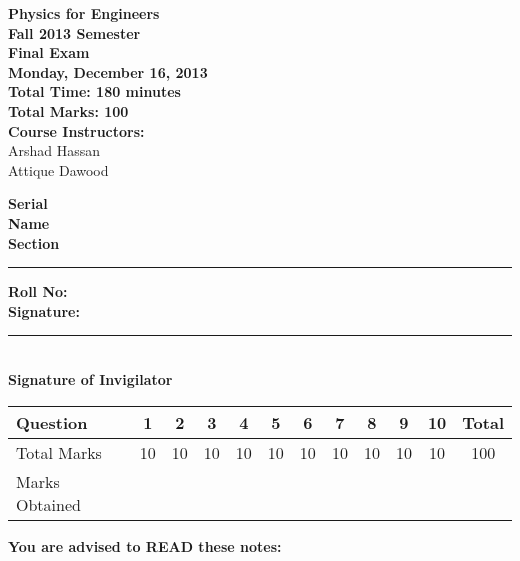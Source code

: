 \documentclass[12pt,a4paper]{article}
\def\QOne{10}
\def\Qtwo{10}
\def\Qthree{10}
\def\Qfour{10}
\def\Qfive{10}
\def\Qsix{10}
\def\Qseven{10}
\def\Qeight{10}
\def\Qnine{10}
\def\Qten{10}
\def\TotalMarks{100}
\begin{document}
\begin{minipage}{0.55\textwidth}
{\LARGE \textbf{Physics for Engineers}}\\[0.15cm]
{\normalsize \textbf{Fall 2013 Semester}}\\
{\Large \textbf{Final Exam}}\\
{\normalsize \textbf{Monday, December 16, 2013}}\\[0.30cm]
{\Large \textbf{Total Time: 180 minutes}}\\[0.15cm]
{\Large \textbf{Total Marks: 100}}\\
\textbf{Course Instructors:}\\
Arshad Hassan\\
Attique Dawood\\
\end{minipage}
\begin{minipage}{0.4\textwidth}
\textbf{Serial} \hrulefill \\[0.25cm]
\textbf{Name} \hrulefill\\[0.25cm]
\textbf{Section} \rule{1cm}{0.2mm} \textbf{Roll No:} \hrulefill\\[0.25cm]
\textbf{Signature:} \hrulefill\\[0.25cm]
\rule{6.6cm}{0.2mm}\\
\textbf{Signature of Invigilator}\\[0.25cm]
\end{minipage}
\begin{table}[H]
\begin{center}
\vspace{0.3cm}
	{\large \begin{tabular}{|l|c|c|c|c|c|c|c|c|c|c|c|}
	\hline
		\rule{0pt}{2.6ex} Question & \textbf{1} & \textbf{2} & \textbf{3} & \textbf{4} & \textbf{5} & \textbf{6} & \textbf{7} & \textbf{8} & \textbf{9} & \textbf{10} & \textbf{Total}\\
		\hline
		Total Marks \rule{0pt}{2.6ex} & \QOne & \Qtwo & \Qthree & \Qfour & \Qfive & \Qsix & \Qseven & \Qeight & \Qnine & \Qten & \TotalMarks\\
		\hline
		Marks Obtained \rule{0pt}{2.6ex} & & & & & & & & & & &\\
	\hline
	\end{tabular}}
\end{center}
\end{table}
\noindent \textbf{You are advised to READ these notes:}
\end{document}
